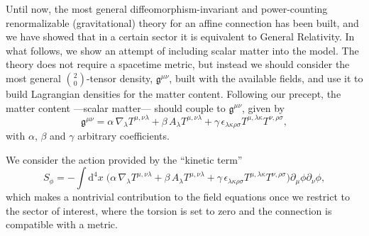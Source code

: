 \documentclass[aps,prd,12pt,twocolumn,superscriptaddress,showpacs,showkeys,reprint,longbibliography]{revtex4-1}
\renewcommand{\(}{\left(}
\renewcommand{\)}{\right)}
\renewcommand{\[}{\left[}
\renewcommand{\]}{\right]}
\newcommand{\dn}[2]{{\mathrm{d}}^{#1}{#2}\;}
\begin{document}
Until now, the most general diffeomorphism-invariant and power-counting renormalizable (gravitational) theory for an affine connection has been built, and we have showed that in a certain sector it is equivalent to General Relativity. In what follows, we show an attempt of including scalar matter into the model. The theory does not require a spacetime metric, but instead we should consider the most general $\binom{2}{0}$-tensor density, $\mathfrak{g}^{\mu\nu}$,  built with the available fields, and use it to build Lagrangian densities for the matter content. Following our precept, the matter content ---scalar matter--- should couple to $\mathfrak{g}^{\mu\nu}$, given by %
\begin{dmath}
  \mathfrak{g}^{\mu\nu} = \alpha \, \nabla_\lambda T^{\mu,\nu\lambda} + \beta \, A_\lambda T^{\mu,\nu\lambda} + \gamma \, \epsilon_{\lambda\kappa\rho\sigma} T^{\mu, \lambda\kappa} T^{\nu, \rho\sigma},
\end{dmath}
with $\alpha$, $\beta$ and $\gamma$ arbitrary coefficients.

We consider the action provided by the ``kinetic term''
\begin{dmath}
  \label{ScalarAction}
  S_\phi = -  \int \dn{4}{x} \Big( \alpha \, \nabla_\lambda T^{\mu,\nu\lambda}  + \beta \, A_\lambda T^{\mu,\nu\lambda} + \gamma \, \epsilon_{\lambda\kappa\rho\sigma} T^{\mu, \lambda\kappa} T^{\nu, \rho\sigma} \Big) \partial_\mu\phi\partial_\nu\phi,
\end{dmath}
which makes a nontrivial contribution to the field equations once we restrict to the sector of interest, where the torsion is set to zero and the connection is compatible with a metric.
\end{document}
